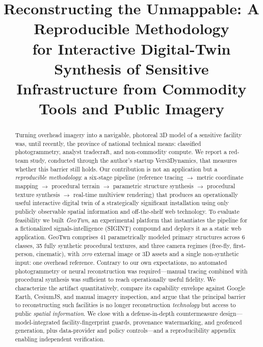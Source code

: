 \documentclass[conference]{IEEEtran}
\begin{document}
\title{Reconstructing the Unmappable: A Reproducible Methodology\\
for Interactive Digital-Twin Synthesis of Sensitive\\
Infrastructure from Commodity Tools and Public Imagery}

\author{
}

\maketitle

\begin{abstract}
Turning overhead imagery into a navigable, photoreal 3D model of a sensitive
facility was, until recently, the province of national technical means:
classified photogrammetry, analyst tradecraft, and non-commodity compute. We
report a red-team study, conducted through the author's startup Vers3Dynamics,
that measures whether this barrier still holds. Our contribution is not an
application but a \emph{reproducible methodology}: a six-stage pipeline
(reference tracing $\rightarrow$ metric coordinate mapping $\rightarrow$
procedural terrain $\rightarrow$ parametric structure synthesis $\rightarrow$
procedural texture synthesis $\rightarrow$ real-time multiview rendering) that
produces an operationally useful interactive digital twin of a
strategically significant installation using only publicly observable spatial
information and off-the-shelf web technology. To evaluate feasibility we built
\emph{GeoTwn}, an experimental platform that instantiates the pipeline for a
fictionalized signals-intelligence (SIGINT) compound and deploys it as a
static web application. GeoTwn comprises 41 parametrically modeled primary
structures across 6 classes, 35 fully synthetic procedural textures, and three
camera regimes (free-fly, first-person, cinematic), with \emph{zero} external
image or 3D assets and a single non-synthetic input: one overhead reference.
Contrary to our own expectations, no automated photogrammetry or neural
reconstruction was required---manual tracing combined with procedural synthesis
was sufficient to reach operationally useful fidelity. We characterize the
artifact quantitatively, compare its capability envelope against Google Earth,
CesiumJS, and manual imagery inspection, and argue that the principal barrier to
reconstructing such facilities is no longer reconstruction \emph{technology} but
access to public \emph{spatial information}. We close with a defense-in-depth
countermeasure design---model-integrated facility-fingerprint guards, provenance
watermarking, and geofenced generation, plus data-provider and policy
controls---and a reproducibility appendix enabling independent verification.
\end{abstract}
\end{document}
